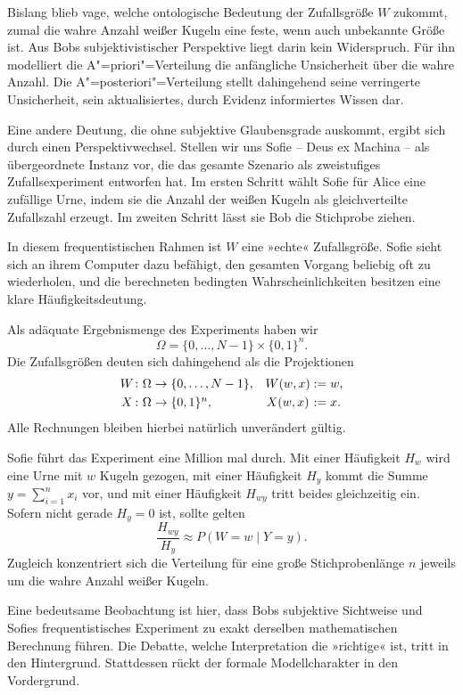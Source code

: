 Bislang blieb vage, welche ontologische Bedeutung der Zufallsgröße $W$
zukommt, zumal die wahre Anzahl weißer Kugeln eine feste, wenn auch
unbekannte Größe ist. Aus Bobs subjektivistischer Perspektive liegt
darin kein Widerspruch. Für ihn modelliert die A"=priori"=Verteilung die
anfängliche Unsicherheit über die wahre Anzahl. Die A"=posteriori"=Verteilung
stellt dahingehend seine verringerte Unsicherheit, sein aktualisiertes,
durch Evidenz informiertes Wissen dar.

Eine andere Deutung, die ohne subjektive Glaubensgrade auskommt,
ergibt sich durch einen Perspektivwechsel. Stellen wir uns Sofie -- Deus ex
Machina -- als übergeordnete Instanz vor, die das gesamte Szenario als zweistufiges
Zufallsexperiment entworfen hat. Im ersten Schritt wählt Sofie für Alice
eine zufällige Urne, indem sie die Anzahl der weißen Kugeln als
gleichverteilte Zufallszahl erzeugt. Im zweiten Schritt lässt sie Bob die
Stichprobe ziehen.

In diesem frequentistischen Rahmen ist $W$ eine »echte« Zufallsgröße.
Sofie sieht sich an ihrem Computer dazu befähigt, den gesamten Vorgang
beliebig oft  zu wiederholen, und die berechneten bedingten
Wahrscheinlichkeiten besitzen eine klare Häufigkeitsdeutung.

Als adäquate Ergebnismenge des Experiments haben wir
\[\Omega = \{0,\ldots, N-1\}\times\{0,1\}^n.\]
Die Zufallsgrößen deuten sich dahingehend als die Projektionen
\[\begin{array}{@{}c@{}l@{\quad}c@{}l@{}}
W&\colon\Omega\to\{0,\ldots,N-1\}, & W(w,x) &{}:= w,\\[3pt]
X&\colon\Omega\to\{0,1\}^n, & X(w,x) &{}:= x.
\end{array}\]
Alle Rechnungen bleiben hierbei natürlich unverändert gültig.

Sofie führt das Experiment eine Million mal durch. Mit einer
Häufigkeit $H_w$ wird eine Urne mit $w$ Kugeln gezogen, mit einer
Häufigkeit $H_y$ kommt die Summe $y=\sum_{i=1}^n x_i$ vor, und mit
einer Häufigkeit $H_{wy}$ tritt beides gleichzeitig ein. Sofern nicht
gerade $H_y=0$ ist, sollte gelten
\[\frac{H_{wy}}{H_y}\approx P(W=w\mid Y=y).\]
Zugleich konzentriert sich die Verteilung für eine große Stichprobenlänge
$n$ jeweils um die wahre Anzahl weißer Kugeln.

Eine bedeutsame Beobachtung ist hier, dass Bobs subjektive Sichtweise und
Sofies frequentistisches Experiment zu exakt derselben mathematischen
Berechnung führen. Die Debatte, welche Interpretation die »richtige« ist,
tritt in den Hintergrund. Stattdessen rückt der formale Modellcharakter
in den Vordergrund.

